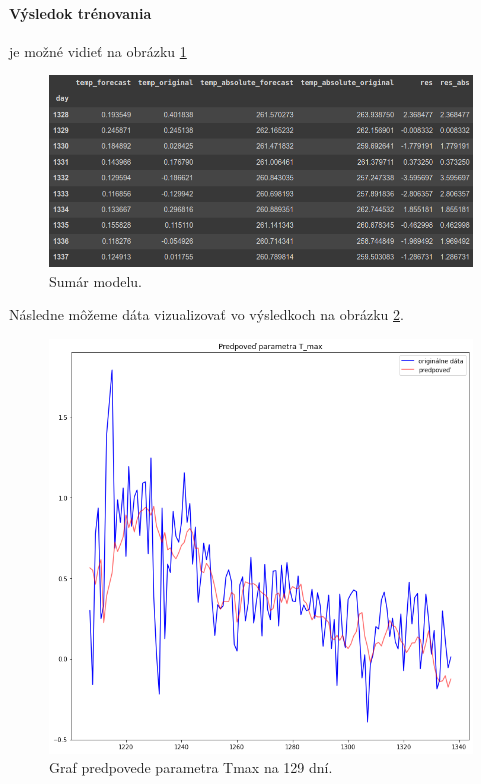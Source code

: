 \newpage
\paragraph{Výsledok trénovania} je možné vidieť na obrázku \ref{tabhondot}
\begin{figure}[!htbp]
  \centering
  \includegraphics[width=13cm]{img/tabulka_hodnot.png}
  \caption{Sumár modelu.}
  \label{tabhondot}
\end{figure}

Následne môžeme dáta vizualizovať vo výsledkoch na obrázku \ref{predpoved}.
\begin{figure}[!htbp]
  \centering
  \includegraphics[width=14cm]{img/predpoved_T_max.png}
  \caption{Graf predpovede parametra Tmax na 129 dní.}
  \label{predpoved}
\end{figure}